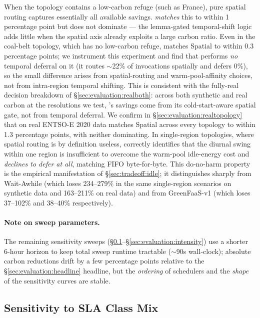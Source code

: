 When the topology contains a low-carbon refuge (such as France),
pure spatial routing captures essentially all available savings.
\GreenFaaS{} \emph{matches} this to within 1 percentage point but
does not dominate --- the lemma-gated temporal-shift logic adds
little when the spatial axis already exploits a large carbon
ratio. Even in the coal-belt topology, which has no low-carbon
refuge, \GreenFaaS{} matches Spatial to within $0.3$ percentage
points; we instrument this experiment and find that \GreenFaaS{}
performs \emph{no} temporal deferral on it (it routes $\sim$22\% of
invocations spatially and defers $0\%$), so the small difference
arises from spatial-routing and warm-pool-affinity choices, not from
intra-region temporal shifting. This is consistent with the
fully-real decision breakdown of \S\ref{sec:evaluation:realboth}:
across both synthetic and real carbon at the resolutions we test,
\GreenFaaS{}'s savings come from its cold-start-aware spatial gate,
not from temporal deferral.
We confirm in
\S\ref{sec:evaluation:realtopology} that on real ENTSO-E 2020 data
\GreenFaaS{} matches
Spatial across every topology to within 1.3 percentage points, with
neither dominating. In
single-region topologies, where spatial routing is by definition
useless, \GreenFaaS{} correctly identifies that the diurnal swing
within one region is insufficient to overcome the warm-pool
idle-energy cost and \emph{declines to defer at all}, matching FIFO
byte-for-byte. This do-no-harm property is the empirical manifestation
of \S\ref{sec:tradeoff:idle}; it distinguishes \GreenFaaS{} sharply
from Wait-Awhile (which loses 234--279\% in the same single-region
scenarios on synthetic data and 163--211\% on real data) and from
GreenFaaS-v1 (which loses 37--102\% and 38--40\% respectively).



\paragraph{Note on sweep parameters.} The remaining sensitivity
sweeps (\S\ref{sec:evaluation:sla}--\S\ref{sec:evaluation:intensity})
use a shorter 6-hour horizon to keep total sweep runtime tractable
($\sim$90s wall-clock); absolute carbon reductions drift by a few
percentage points relative to the \S\ref{sec:evaluation:headline}
headline, but the \emph{ordering} of schedulers and the \emph{shape}
of the sensitivity curves are stable.

\subsection{Sensitivity to SLA Class Mix}
\label{sec:evaluation:sla}

